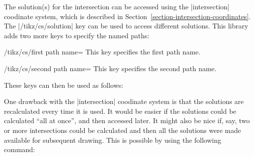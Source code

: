   The solution(s) for the intersection can be accessed using the
  |intersection| coodinate system, which is described in 
  Section~\ref{section-intersection-coordinates}. The 
  |/tikz/cs/solution| key can be used to access different
  solutions. This library adds two more keys
  to specify the named paths:

\begin{key}{/tikz/cs/first path name=}
  This key specifies the first path name.
\end{key}

\begin{key}{/tikz/cs/second path name=}
  This key specifies the second path name.
\end{key}
  
  These keys can then be used as follows:
  
\begin{codeexample}[]
\end{codeexample}

  One drawback with the |intersection| coodinate system is that
  the solutions are recalculated every time it is used. It would be
  easier if the solutions could be calculated ``all at once'', and
  then accessed later. It might also be nice if, say, two or
  more intersections could be calculated and then all the solutions
  were made available for subsequent drawing.
  This is possible by using the following command:
 
